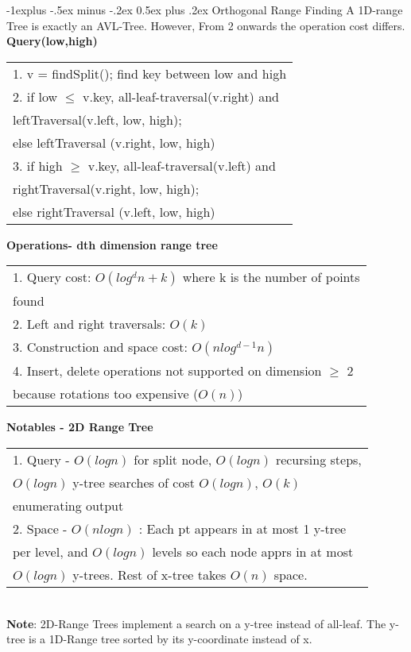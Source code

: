 \documentclass[10pt,landscape]{article}
\makeatletter
\renewcommand{\subsection}{\@startsection{subsection}{2}{0mm}%
                                {-1explus -.5ex minus -.2ex}%
                                {0.5ex plus .2ex}%
                                {\normalfont\normalsize\bfseries}}
\makeatother
\begin{document}
\begin{multicols}{3}
\subsection{Orthogonal Range Finding} 
A 1D-range Tree is exactly an AVL-Tree. However, From 2 onwards the operation cost differs. \\
\textbf{Query(low,high)} \\
\begin{tabular}{l} 
1. v = findSplit(); find key between low and high \\ 
2. if low $\leq$ v.key, all-leaf-traversal(v.right) and \\ leftTraversal(v.left, low, high); \\ else leftTraversal (v.right, low, high) \\ 
3. if high $\geq$ v.key, all-leaf-traversal(v.left) and \\ rightTraversal(v.right, low, high); \\ else rightTraversal (v.left, low, high) \\ 
\end{tabular}
\textbf{Operations- dth dimension range tree} \\
\begin{tabular}{l} 
1. Query cost: $O(log^dn + k)$ where k is the number of points \\ found \\
2. Left and right traversals: $O(k)$ \\ 
3. Construction and space cost: $O(nlog^{d-1}n)$ \\
4. Insert, delete operations not supported on dimension $\geq$ 2 \\ because rotations too expensive ($O(n)$) 
\end{tabular}
\textbf{Notables - 2D Range Tree} 
\begin{tabular}{l}
1. Query - $O(logn)$ for split node, $O(logn)$ recursing steps, \\ $O(logn)$ y-tree searches of cost $O(logn)$, $O(k)$ \\ enumerating output \\ 
2. Space - $O(nlogn)$ : Each pt appears in at most 1 y-tree \\ per level, and $O(logn)$ levels so each node apprs in at most \\ $O(logn)$ y-trees. Rest of x-tree takes $O(n)$ space. 
\end{tabular} \\ 
\textbf{Note}: 2D-Range Trees implement a search on a y-tree instead of all-leaf. The y-tree is a 1D-Range tree sorted by its y-coordinate instead of x. 


\end{multicols}
\end{document}
